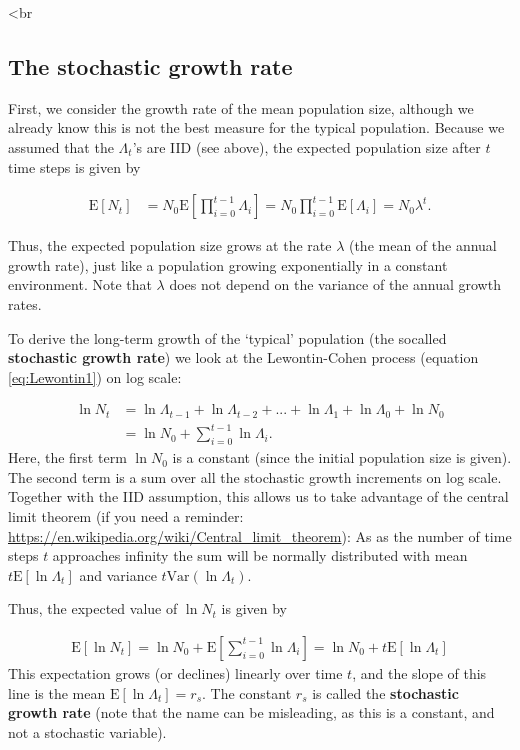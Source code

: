 \documentclass[
]{book}
\begin{document}
\textless br

\hypertarget{the-stochastic-growth-rate}{%
\subsection{The stochastic growth rate}\label{the-stochastic-growth-rate}}

First, we consider the growth rate of the mean population size, although we already know this is not the best measure for the typical population. Because we assumed that the \(\Lambda_t\)'s are IID (see above), the expected population size after \(t\) time steps is given by

\begin{align}
\text{E}[N_t]&=N_0\text{E}\left[\prod_{i=0}^{t-1} \Lambda_i\right] =N_0\prod_{i=0}^{t-1}\text{E}[\Lambda_i] =N_0\lambda^t.
\label{eq:MeanGrowth}
\end{align}

Thus, the expected population size grows at the rate \(\lambda\) (the mean of the annual growth rate), just like a population growing exponentially in a constant environment. Note that \(\lambda\) does not depend on the variance of the annual growth rates.

To derive the long-term growth of the `typical' population (the socalled \textbf{stochastic growth rate}) we look at the Lewontin-Cohen process (equation \eqref{eq:Lewontin1}) on log scale:

\begin{align}
\ln N_t&=\ln \Lambda_{t-1}+\ln\Lambda_{t-2}+...+\ln\Lambda_{1}+\ln\Lambda_0+\ln N_0\\ &=\ln N_0+ \sum_{i=0}^{t-1} \ln \Lambda_i.
\label{eq:Lewontin2}
\end{align}
Here, the first term \(\ln N_0\) is a constant (since the initial population size is given). The second term is a sum over all the stochastic growth increments on log scale. Together with the IID assumption, this allows us to take advantage of the central limit theorem (if you need a reminder: \url{https://en.wikipedia.org/wiki/Central_limit_theorem}): As as the number of time steps \(t\) approaches infinity the sum will be normally distributed with mean \(t\text{E}[\ln\Lambda_t]\) and variance \(t\text{Var}(\ln\Lambda_t)\).

Thus, the expected value of \(\ln N_t\) is given by

\begin{align}
\text{E}[\ln N_t]=\ln N_0 + \text{E}\left[\sum_{i=0}^{t-1} \ln \Lambda_i\right]=\ln N_0 + t\text{E}[\ln\Lambda_t]
\end{align}
This expectation grows (or declines) linearly over time \(t\), and the slope of this line is the mean \(\text{E}[\ln\Lambda_t]=r_s\). The constant \(r_s\) is called the \textbf{stochastic growth rate} (note that the name can be misleading, as this is a constant, and not a stochastic variable).
\end{document}
